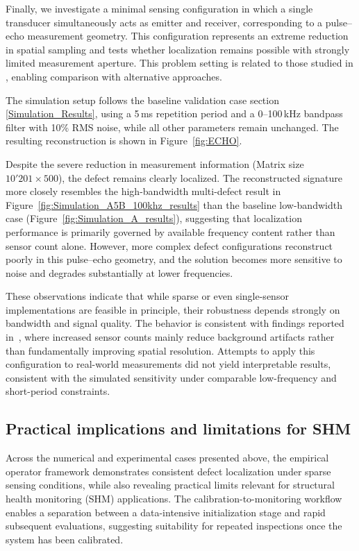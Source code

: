\documentclass[a4paper,fleqn]{cas-sc}
\begin{document}
Finally, we investigate a minimal sensing configuration in which a single transducer simultaneously acts as emitter and receiver, corresponding to a pulse--echo measurement geometry. This configuration represents an extreme reduction in spatial sampling and tests whether localization remains possible with strongly limited measurement aperture. This problem setting is related to those studied in \cite{ebrahimkhanlou_acoustic_2017,One_Channel_reversal}, enabling comparison with alternative approaches. 

The simulation setup follows the baseline validation case section \ref{Simulation_Results}, using a 5\,ms repetition period and a 0--100\,kHz bandpass filter with 10\% RMS noise, while all other parameters remain unchanged. The resulting reconstruction is shown in Figure~\ref{fig:ECHO}.

Despite the severe reduction in measurement information (Matrix size $10'201 \times 500$), the defect remains clearly localized. The reconstructed signature more closely resembles the high-bandwidth multi-defect result in Figure~\ref{fig:Simulation_A5B_100khz_results} than the baseline low-bandwidth case (Figure~\ref{fig:Simulation_A_results}), suggesting that localization performance is primarily governed by available frequency content rather than sensor count alone. However, more complex defect configurations reconstruct poorly in this pulse--echo geometry, and the solution becomes more sensitive to noise and degrades substantially at lower frequencies.

These observations indicate that while sparse or even single-sensor implementations are feasible in principle, their robustness depends strongly on bandwidth and signal quality. The behavior is consistent with findings reported in~\cite{Touchscreen}, where increased sensor counts mainly reduce background artifacts rather than fundamentally improving spatial resolution. Attempts to apply this configuration to real-world measurements did not yield interpretable results, consistent with the simulated sensitivity under comparable low-frequency and short-period constraints.

\subsection{Practical implications and limitations for SHM}\label{Discussion_SHM}

Across the numerical and experimental cases presented above, the empirical operator framework demonstrates consistent defect localization under sparse sensing conditions, while also revealing practical limits relevant for structural health monitoring (SHM) applications. The calibration-to-monitoring workflow enables a separation between a data-intensive initialization stage and rapid subsequent evaluations, suggesting suitability for repeated inspections once the system has been calibrated.
\end{document}
